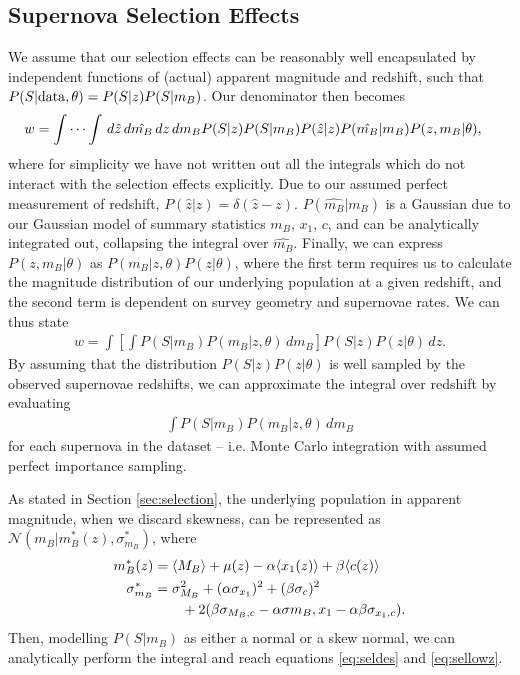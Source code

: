 \documentclass[a4paper,fleqn,usenatbib]{mnras}
\begin{document}
\subsection{Supernova Selection Effects}

We assume that our selection effects can be reasonably well encapsulated by independent functions of (actual) apparent magnitude and redshift, such that $P(S|{\rm data}, \theta) = P(S|z) P(S|m_B)$. Our denominator then becomes
\begin{align}
w &= \idotsint \, d\hat{z} \, d\hat{m_B} \, dz \, dm_B P(S|z) P(S|m_B) P(\hat{z}|z) P(\hat{m_B}|m_B) P(z, m_B | \theta),
\end{align}
where for simplicity we have not written out all the integrals which do not interact with the selection effects explicitly. Due to our assumed perfect measurement of redshift, $P(\hat{z}|z) = \delta(\hat{z} - z)$. $P(\hat{m_B} | m_B)$ is a Gaussian due to our Gaussian model of summary statistics $m_B$, $x_1$, $c$, and can be analytically integrated out, collapsing the integral over $\hat{m_B}$. Finally, we can express $P(z, m_B | \theta)$ as  $P(m_B | z, \theta) P(z | \theta)$, where the first term requires us to calculate the magnitude distribution of our underlying population at a given redshift, and the second term is dependent on survey geometry and supernovae rates. We can thus state
\begin{align}
w = \int \left[ \int P(S|m_B) P(m_B | z, \theta)\, dm_B \right] P(S|z)P(z|\theta)\, dz.
\end{align}
By assuming that the distribution $P(S|z)P(z|\theta)$ is well sampled by the observed supernovae redshifts, we can approximate the integral over redshift by evaluating
\begin{align}
\int P(S|m_B) P(m_B | z, \theta)\, dm_B
\end{align}
for each supernova in the dataset -- i.e. Monte Carlo integration with assumed perfect importance sampling.

As stated in Section \ref{sec:selection}, the underlying population in apparent magnitude, when we discard skewness, can be represented as $\mathcal{N}(m_B|m_B^*(z), \sigma^*_{m_B})$, where
\begin{align}
m_B^*(z) &= \langle M_B \rangle + \mu(z) - \alpha \langle x_1(z) \rangle + \beta \langle c(z) \rangle \\
\sigma^*_{m_B} &= \sigma_{M_B}^2 + (\alpha \sigma_{x_1})^2 + (\beta \sigma_c)^2 \notag\\ 
&\quad\quad + 2(\beta \sigma_{M_B,c} - \alpha \sigma{m_B,x_1} - \alpha \beta \sigma_{x_1,c}).
\end{align}
Then, modelling $P(S|m_B)$ as either a normal or a skew normal, we can analytically perform the integral and reach equations \eqref{eq:seldes} and \eqref{eq:sellowz}.




\bsp	%
\label{lastpage}
\end{document}
